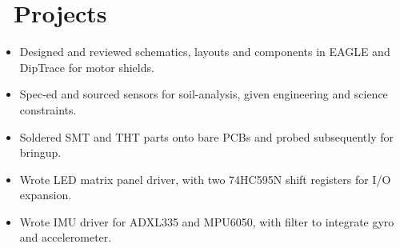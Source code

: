 \documentclass{resume}
\begin{document}
\section{\faFlask\ Projects}


\begin{itemize}
  \item Designed and reviewed schematics, layouts and components in EAGLE and DipTrace for motor shields. %
  \item Spec-ed and sourced sensors for soil-analysis, given engineering and science constraints.
  \item Soldered SMT and THT parts onto bare PCBs and probed subsequently for bringup.
\end{itemize}

\begin{itemize}
  \item Wrote LED matrix panel driver, with two 74HC595N shift registers for I/O expansion.
  \item Wrote IMU driver for ADXL335 and MPU6050, with filter to integrate gyro and accelerometer.
\end{itemize}

\end{document}
